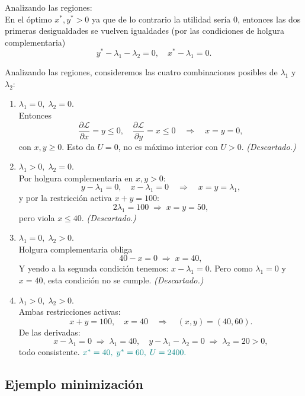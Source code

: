 \documentclass{article}
\begin{document}
Analizando las regiones:\\
En el óptimo \(x^*,y^*>0\) ya que de lo contrario la utilidad sería 0, entonces las dos primeras desigualdades se vuelven igualdades (por las condiciones de holgura complementaria)
  \[
  y^*-\lambda_1-\lambda_2=0,\quad
  x^*-\lambda_1=0.
  \]



Analizando las regiones, consideremos las cuatro combinaciones posibles de \(\lambda_1\) y \(\lambda_2\):

\begin{enumerate}[label=\textbf{Caso \arabic*:}]
  \item \(\lambda_1=0,\;\lambda_2=0\).\\
    Entonces
    \[
      \frac{\partial\mathcal L}{\partial x}=y\le0,
      \quad
      \frac{\partial\mathcal L}{\partial y}=x\le0
      \quad\Longrightarrow\quad x=y=0,
    \]
    con \(x,y\ge0\). Esto da \(U=0\), no es máximo interior con \(U>0\).  
    \emph{\color{teal}(Descartado.)}

  \item \(\lambda_1>0,\;\lambda_2=0\).\\
    Por holgura complementaria en \(x,y>0\):
    \[
      y-\lambda_1=0,\quad x-\lambda_1=0
      \quad\Longrightarrow\quad x=y=\lambda_1,
    \]
    y por la restricción activa \(x+y=100\):
    \[
      2\lambda_1=100\;\Rightarrow\;x=y=50,
    \]
    pero viola \(x\le40\).  
    \emph{\color{teal}(Descartado.)}

  \item \(\lambda_1=0,\;\lambda_2>0\).\\
    Holgura complementaria obliga
    \[
      40-x=0\;\Rightarrow\;x=40,
    \]
    Y yendo a la segunda condición tenemos: $x-\lambda_1=0$. Pero como $\lambda_1=0$ y $x=40$, esta condición no se cumple.
    \emph{\color{teal}(Descartado.)}

  \item \(\lambda_1>0,\;\lambda_2>0\).\\
    Ambas restricciones activas:
    \[
      x+y=100,\quad x=40
      \quad\Longrightarrow\quad (x,y)=(40,60).
    \]
    De las derivadas:
    \[
      x-\lambda_1=0\;\Rightarrow\;\lambda_1=40,
      \quad
      y-\lambda_1-\lambda_2=0\;\Rightarrow\;\lambda_2=20>0,
    \]
    todo consistente.  
    \(\color{teal}{x^*=40,\;y^*=60,\;U=2400.}\)
\end{enumerate}


\subsection*{Ejemplo minimización}
\end{document}
